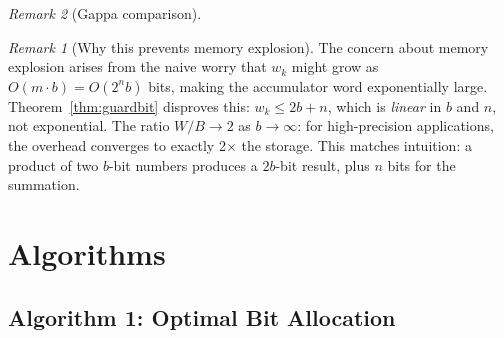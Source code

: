\documentclass[11pt,a4paper]{article}
\theoremstyle{definition}
\theoremstyle{plain}
\theoremstyle{remark}
\newtheorem{remark}{Remark}[section]
\begin{document}
\begin{remark}[Gappa comparison]
\begin{remark}[Why this prevents memory explosion]\label{rem:no-explosion}
The concern about memory explosion arises from the naive worry that
$w_k$ might grow as $O(m \cdot b) = O(2^n b)$ bits, making the
accumulator word exponentially large.
Theorem~\ref{thm:guardbit} disproves this: $w_k \le 2b + n$, which is
\emph{linear} in $b$ and $n$, not exponential.
The ratio $W/B \to 2$ as $b\to\infty$: for high-precision applications,
the overhead converges to exactly 2$\times$ the storage.
This matches intuition: a product of two $b$-bit numbers produces a
$2b$-bit result, plus $n$ bits for the summation.
\end{remark}

\section{Algorithms}
\label{sec:algo}

\subsection{Algorithm 1: Optimal Bit Allocation}


\end{remark}
\end{document}
